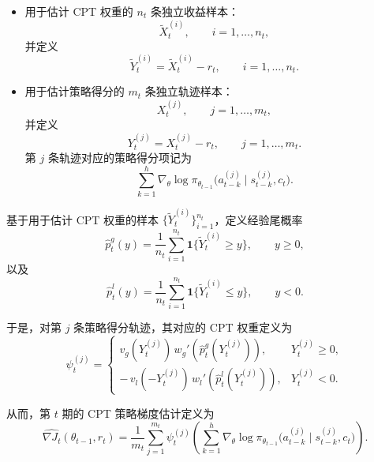 \begin{itemize}
\item 用于估计 CPT 权重的 $n_t$ 条独立收益样本：
\begin{equation}
\widetilde X_t^{(i)},\qquad i=1,\dots,n_t,
\end{equation}
并定义
\begin{equation}
\widetilde Y_t^{(i)}=\widetilde X_t^{(i)}-r_t,\qquad i=1,\dots,n_t.
\end{equation}

\item 用于估计策略得分的 $m_t$ 条独立轨迹样本：
\begin{equation}
X_t^{(j)},\qquad j=1,\dots,m_t,
\end{equation}
并定义
\begin{equation}
Y_t^{(j)}=X_t^{(j)}-r_t,\qquad j=1,\dots,m_t.
\end{equation}
第 $j$ 条轨迹对应的策略得分项记为
\begin{equation}
\sum_{k=1}^{h}
\nabla_\theta
\log \pi_{\theta_{t-1}}
\bigl(
a_{t-k}^{(j)}\mid s_{t-k}^{(j)},c_t
\bigr).
\end{equation}
\end{itemize}

基于用于估计 CPT 权重的样本 $\{\widetilde Y_t^{(i)}\}_{i=1}^{n_t}$，定义经验尾概率
\begin{equation}
\widehat p_t^g(y)
=
\frac{1}{n_t}
\sum_{i=1}^{n_t}
\mathbf 1\{\widetilde Y_t^{(i)}\ge y\},
\qquad y\ge 0,
\end{equation}
以及
\begin{equation}
\widehat p_t^l(y)
=
\frac{1}{n_t}
\sum_{i=1}^{n_t}
\mathbf 1\{\widetilde Y_t^{(i)}\le y\},
\qquad y<0.
\end{equation}

于是，对第 $j$ 条策略得分轨迹，其对应的 CPT 权重定义为
\begin{equation}
\psi_t^{(j)}
=
\begin{cases}
v_g\!\left(Y_t^{(j)}\right)\,
w_g'\!\left(\widehat p_t^g(Y_t^{(j)})\right),
& Y_t^{(j)}\ge 0,\\[1.2ex]
-\,v_l\!\left(-Y_t^{(j)}\right)\,
w_l'\!\left(\widehat p_t^l(Y_t^{(j)})\right),
& Y_t^{(j)}<0.
\end{cases}
\end{equation}

从而，第 $t$ 期的 CPT 策略梯度估计定义为
\begin{equation}
\label{eq:CPT-gradient-estimator}
\widehat{\nabla J_t}(\theta_{t-1},r_t)
=
\frac{1}{m_t}
\sum_{j=1}^{m_t}
\psi_t^{(j)}
\left(
\sum_{k=1}^{h}
\nabla_\theta
\log \pi_{\theta_{t-1}}
\bigl(
a_{t-k}^{(j)}\mid s_{t-k}^{(j)},c_t
\bigr)
\right).
\end{equation}

